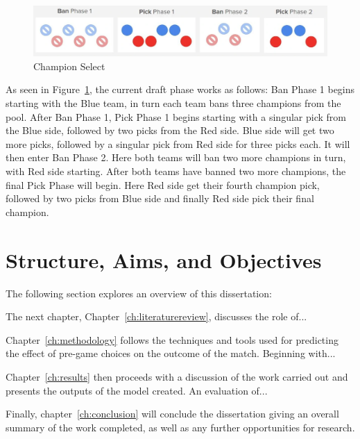 \begin{figure}[h!]
    \centering
    \includegraphics[width=1\textwidth]{figures/DraftPhase}
    \caption{Champion Select}
    \label{fig:draft}
\end{figure}

As seen in Figure~\ref{fig:draft}, the current draft phase works as follows:
Ban Phase 1 begins starting with the Blue team, in turn each team bans three champions from the pool.
After Ban Phase 1, Pick Phase 1 begins starting with a singular pick from the Blue side, followed by two picks from the Red side.
Blue side will get two more picks, followed by a singular pick from Red side for three picks each.
It will then enter Ban Phase 2.
Here both teams will ban two more champions in turn, with Red side starting.
After both teams have banned two more champions, the final Pick Phase will begin.
Here Red side get their fourth champion pick, followed by two picks from Blue side and finally Red side pick their final champion.

\section{Structure, Aims, and Objectives}\label{sec:Structure, Aims, and Objectives}

The following section explores an overview of this dissertation:

The next chapter, Chapter~\ref{ch:literaturereview}, discusses the role of...

Chapter~\ref{ch:methodology} follows the techniques and tools used for predicting the effect of pre-game choices on the outcome of the match.
Beginning with...


Chapter~\ref{ch:results} then proceeds with a discussion of the work
carried out and presents the outputs of the model created.
An evaluation of...

Finally, chapter~\ref{ch:conclusion} will conclude the dissertation giving an overall summary of the work completed, as well as any further opportunities for research. \\


